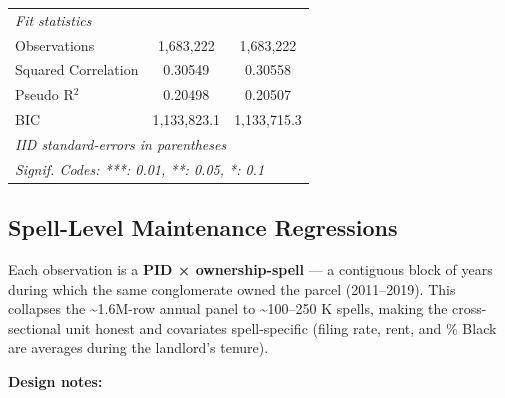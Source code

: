 \documentclass[
  11pt,
]{article}
\begin{document}
\begin{center}
{\begin{tabular}{lcc}
   \midrule
   \emph{Fit statistics}\\
   Observations                                    & 1,683,222      & 1,683,222\\  
   Squared Correlation                             & 0.30549        & 0.30558\\  
   Pseudo R$^2$                                    & 0.20498        & 0.20507\\  
   BIC                                             & 1,133,823.1    & 1,133,715.3\\  
   \midrule \midrule
   \multicolumn{3}{l}{\emph{IID standard-errors in parentheses}}\\
   \multicolumn{3}{l}{\emph{Signif. Codes: ***: 0.01, **: 0.05, *: 0.1}}\\
\end{tabular}
}
\end{center}

\subsection{Spell-Level Maintenance
Regressions}\label{spell-level-maintenance-regressions}

Each observation is a \textbf{PID × ownership-spell} --- a contiguous
block of years during which the same conglomerate owned the parcel
(2011--2019). This collapses the \textasciitilde1.6M-row annual panel to
\textasciitilde100--250 K spells, making the cross-sectional unit honest
and covariates spell-specific (filing rate, rent, and \% Black are
averages during the landlord's tenure).

\textbf{Design notes:}
\end{document}
